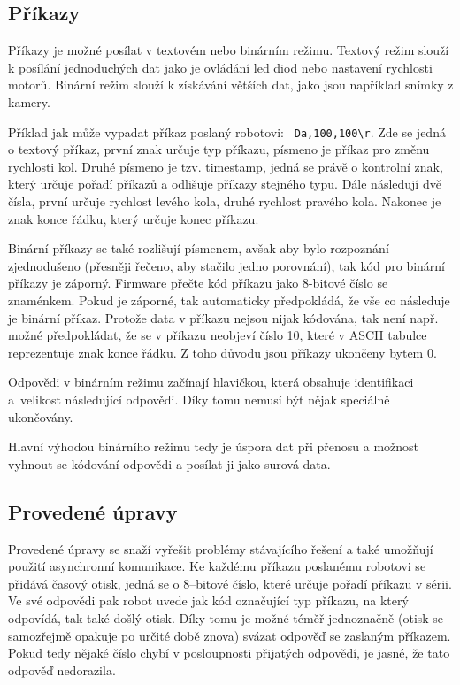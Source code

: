     \subsection{Příkazy}
    \label{btcom:prikazy}

    Příkazy je možné posílat v textovém nebo binárním režimu. Textový režim
    slouží k posílání jednoduchých dat jako je ovládání led diod nebo nastavení
    rychlosti motorů. Binární režim slouží k získávání větších dat, jako jsou
    například snímky z kamery.

    Příklad jak může vypadat příkaz poslaný robotovi: {\tt
    Da,100,100\textbackslash r}. Zde se jedná o textový příkaz, první znak
    určuje typ příkazu, písmeno  je příkaz pro změnu rychlosti kol. Druhé
    písmeno je tzv. timestamp, jedná se právě o kontrolní znak, který určuje
    pořadí příkazů a odlišuje příkazy stejného typu. Dále následují dvě čísla,
    první určuje rychlost levého kola, druhé rychlost pravého kola. Nakonec je
    znak konce řádku, který určuje konec příkazu.

    Binární příkazy se také rozlišují písmenem, avšak aby bylo rozpoznání
    zjednodušeno (přesněji řečeno, aby stačilo jedno porovnání), tak kód pro
    binární příkazy je záporný. Firmware přečte kód příkazu jako 8-bitové
    číslo se znaménkem. Pokud je záporné, tak automaticky předpokládá, že vše
    co následuje je binární příkaz. Protože data v příkazu nejsou nijak
    kódována, tak není např. možné předpokládat, že se v příkazu neobjeví číslo
    10, které v ASCII tabulce reprezentuje znak konce řádku. Z toho důvodu jsou
    příkazy ukončeny bytem 0.

    Odpovědi v binárním režimu začínají hlavičkou, která obsahuje identifikaci
    a~velikost následující odpovědi. Díky tomu nemusí být nějak speciálně
    ukončovány.

    Hlavní výhodou binárního režimu tedy je úspora dat při přenosu a možnost
    vyhnout se kódování odpovědi a posílat ji jako surová data.

    \subsection{Provedené úpravy}
    \label{btcom:upravy}

    Provedené úpravy se snaží vyřešit problémy stávajícího řešení a také
    umožňují použití asynchronní komunikace. Ke každému příkazu poslanému
    robotovi se přidává časový otisk, jedná se o 8--bitové číslo, které určuje
    pořadí příkazu v sérii. Ve své odpovědi pak robot uvede jak kód označující
    typ příkazu, na který odpovídá, tak také došlý otisk. Díky tomu je možné
    téměř jednoznačně (otisk se samozřejmě opakuje po určité době znova) svázat
    odpověď se zaslaným příkazem. Pokud tedy nějaké číslo chybí v posloupnosti
    přijatých odpovědí, je jasné, že tato odpověď nedorazila.

